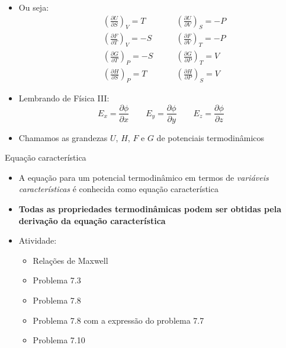 \begin{frame}
    \begin{itemize}
        \item Ou seja:
            \begin{align*}
                    & \left(\frac{\partial U}{\partial S}\right)_V = T \qquad & \left(\frac{\partial U}{\partial V}\right)_S = -P \\
                    & \left(\frac{\partial F}{\partial T}\right)_V = -S \qquad & \left(\frac{\partial F}{\partial V}\right)_T = -P \\
                    & \left(\frac{\partial G}{\partial T}\right)_P = -S \qquad & \left(\frac{\partial G}{\partial P}\right)_T = V \\
                    & \left(\frac{\partial H}{\partial S}\right)_P = T \qquad & \left(\frac{\partial H}{\partial P}\right)_S = V
            \end{align*}
        \item Lembrando de Física III:
            \[
                E_x = \frac{\partial \phi}{\partial x} \qquad
                E_y = \frac{\partial \phi}{\partial y} \qquad
                E_z = \frac{\partial \phi}{\partial z} 
            \]
        \item Chamamos as grandezas \(U\), \(H\), \(F\) e \(G\) de potenciais termodinâmicos
    \end{itemize}
\end{frame}

\begin{frame}[c]{Equação característica}
    \begin{itemize}
        \item A equação para um potencial termodinâmico em termos de \textit{variáveis características} é conhecida
            como equação característica
        \item \textbf{Todas as propriedades termodinâmicas podem ser obtidas pela derivação da equação característica}
        \item Atividade: 
            \begin{itemize}
                \item Relações de Maxwell
                \item Problema 7.3
                \item Problema 7.8
                \item Problema 7.8 com a expressão do problema 7.7
                \item Problema 7.10

            \end{itemize}
    \end{itemize}
\end{frame}
